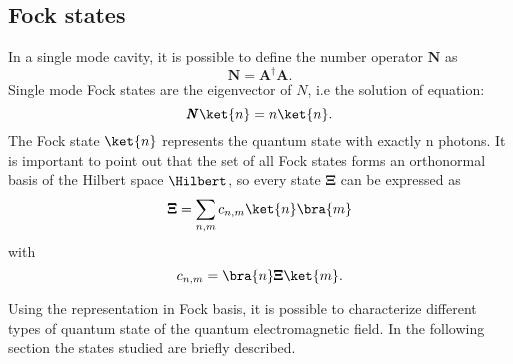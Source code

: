     \subsection{Fock states}
        In a single mode cavity, it is possible to define the number operator $\pmb{N}$ as
        \begin{equation}
            \pmb{N}=\pmb{A}^\dagger \pmb{A}.
        \end{equation}
        Single mode Fock states are the eigenvector of $N$, i.e the solution of equation:
        \begin{equation}
            \pmb{N}\ket{n}=n\ket{n}.
        \end{equation}
        The Fock state $\ket{n}$ represents the quantum state with exactly n photons.
        It is important to point out that the set of all Fock states forms an orthonormal basis
        of the Hilbert space $\Hilbert$, so every state $\pmb{\Xi}$ can be expressed as
        \begin{equation}
            \pmb{\Xi} = \sum_{n,m} c_{n,m}\ket{n}\bra{m}
            \label{eq:QEF.4}
        \end{equation}
        with
        \begin{equation*}
            c_{n,m}=\bra{n}\pmb{\Xi}\ket{m}.
        \end{equation*}

        Using the representation in Fock basis, it is possible to characterize different types
        of quantum state of the quantum electromagnetic field. In the following section the 
        states studied are briefly described.